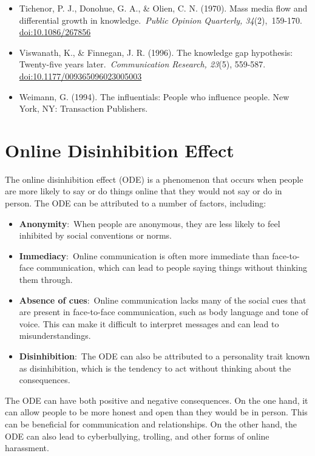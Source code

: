 \documentclass[
  b5paper]{book}
\begin{document}
\begin{itemize}
\item
  Tichenor, P. J., Donohue, G. A., \& Olien, C. N. (1970). Mass media flow and differential growth in knowledge.~\emph{Public Opinion Quarterly, 34}(2),~159-170. \url{doi:10.1086/267856}
\item
  Viswanath, K., \& Finnegan, J. R. (1996). The knowledge gap hypothesis: Twenty-five years later.~\emph{Communication Research, 23}(5), 559-587. \url{doi:10.1177/009365096023005003}
\item
  Weimann, G. (1994). The influentials: People who influence people. New York, NY: Transaction Publishers.
\end{itemize}

\hypertarget{online-disinhibition-effect}{%
\section{Online Disinhibition Effect}\label{online-disinhibition-effect}}

The online disinhibition effect (ODE) is a phenomenon that occurs when people are more likely to say or do things online that they would not say or do in person. The ODE can be attributed to a number of factors, including:

\begin{itemize}
\item
  \textbf{Anonymity}:~When people are anonymous, they are less likely to feel inhibited by social conventions or norms.
\item
  \textbf{Immediacy}:~Online communication is often more immediate than face-to-face communication, which can lead to people saying things without thinking them through.
\item
  \textbf{Absence of cues}:~Online communication lacks many of the social cues that are present in face-to-face communication, such as body language and tone of voice. This can make it difficult to interpret messages and can lead to misunderstandings.
\item
  \textbf{Disinhibition}:~The ODE can also be attributed to a personality trait known as disinhibition, which is the tendency to act without thinking about the consequences.
\end{itemize}

The ODE can have both positive and negative consequences. On the one hand, it can allow people to be more honest and open than they would be in person. This can be beneficial for communication and relationships. On the other hand, the ODE can also lead to cyberbullying, trolling, and other forms of online harassment.
\end{document}
